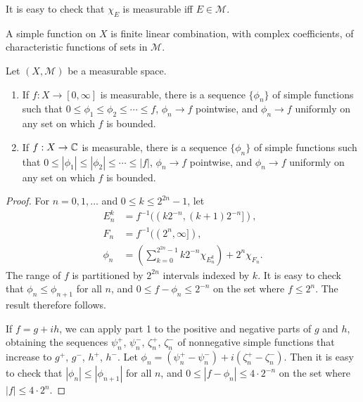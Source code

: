 It is easy to check that $\chi_E$ is measurable iff $E \in \mathcal{M}$.

\begin{definition}
    A simple function on $X$ is finite linear combination, with complex coefficients, of characteristic functions of sets in $\mathcal{M}$.
\end{definition}

\begin{theorem}
    Let $(X, \mathcal{M})$ be a measurable space.
    \begin{enumerate}
        \item If $f: X \to [0, \infty]$ is measurable, there is a sequence $\{ \phi_n \}$ of simple functions such that $0 \le \phi_1 \le \phi_2 \le \cdots \le f$, $\phi_n \to f$ pointwise, and $\phi_n \to f$ uniformly on any set on which $f$ is bounded.
        \item If $f: X \to \mathbb{C}$ is measurable, there is a sequence $\{ \phi_n \}$ of simple functions such that $0 \le |\phi_1| \le |\phi_2| \le \cdots \le |f|$, $\phi_n \to f$ pointwise, and $\phi_n \to f$ uniformly on any set on which $f$ is bounded.
    \end{enumerate}
\end{theorem}

\begin{proof}
    For $n=0, 1, \dots$ and $0 \le k \le 2^{2n}-1$, let
    \begin{align}
        E_{n}^{k} & = f^{-1}((k 2^{-n}, (k+1) 2^{-n}]), \\
        F_{n} & = f^{-1}((2^n, \infty]), \\
        \phi_{n} & = \left( \sum_{k=0}^{2^{2n}-1} k 2^{-n} \chi_{E_{n}^{k}} \right) + 2^{n} \chi_{F_{n}}.
    \end{align}
    The range of $f$ is partitioned by $2^{2n}$ intervals indexed by $k$.
    It is easy to check that $\phi_{n} \le \phi_{n+1}$ for all $n$, and $0 \le f - \phi_{n} \le 2^{-n}$ on the set where $f \le 2^{n}$.
    The result therefore follows.

    If $f = g + i h$, we can apply part 1 to the positive and negative parts of $g$ and $h$, obtaining the sequences $\psi_{n}^{+}$, $\psi_{n}^{-}$, $\zeta_{n}^{+}$, $\zeta_{n}^{-}$ of nonnegative simple functions that increase to $g^+$, $g^-$, $h^+$, $h^-$.
    Let $\phi_n = (\psi_{n}^{+} - \psi_{n}^{-}) + i (\zeta_{n}^{+} - \zeta_{n}^{-})$.
    Then it is easy to check that $|\phi_{n}| \le |\phi_{n+1}|$ for all $n$, and $0 \le |f - \phi_{n}| \le 4 \cdot 2^{-n}$ on the set where $|f| \le 4 \cdot 2^{n}$.
\end{proof}

